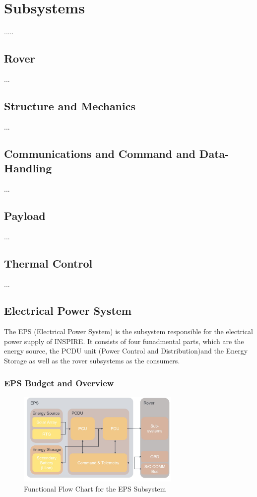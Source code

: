 \chapter{Subsystems}
\label{chap:subsystems}
.....



\section{Rover}
\label{sec:rover}
...
\section{Structure and Mechanics}
\label{sec:mechanics}
...
\section{Communications and Command and Data-Handling}
\label{sec:comm}
...
\section{Payload}
\label{sec:payload}
...
\section{Thermal Control}
\label{sec:thermalcontrol}
...
\section{Electrical Power System}
\label{sec:EPS}
The EPS (Electrical Power System) is the subsystem responsible for the electrical power supply of INSPIRE. It consists of four funadmental parts, which are the energy source, the PCDU unit (Power Control and Distribution)and the Energy Storage as well as the rover subsystems as the consumers.

\subsection{EPS Budget and Overview}

\begin{figure}[htb]
{\centering
\includegraphics[width=0.7\textwidth]{Media/epsflowchart}
\caption{Functional Flow Chart for the EPS Subsystem}
\label{fig:epsflowchart}
}
\end{figure}

